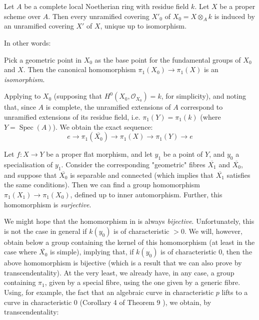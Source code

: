 \begin{theorem}\label{fga2-theorem-12}
    Let $A$ be a complete local Noetherian ring with residue field $k$.
    Let $X$ be a proper scheme over $A$.
    Then every unramified covering $X'_0$ of $X_0=X\otimes_Ak$ is induced by an unramified covering $X'$ of $X$, unique up to isomorphism.
\end{theorem}

In other words:

\begin{corollary}\label{fga2-theorem-12-corollary-1}
    Pick a geometric point in $X_0$ as the base point for the fundamental groups of $X_0$ and $X$.
    Then the canonical homomorphism $\pi_1(X_0)\to\pi_1(X)$ is an \emph{isomorphism}.
\end{corollary}


Applying  to $X_0$ (supposing that $H^0(X_0,\mathcal{O}_{X_0})=k$, for simplicity), and noting that, since $A$ is complete, the unramified extensions of $A$ correspond to unramified extensions of its residue field, i.e. $\pi_1(Y)=\pi_1(k)$ (where $Y=\operatorname{Spec}(A)$).
We obtain the exact sequence:
\[e \to \pi_1(\overline{X_0}) \to \pi_1(X) \to \pi_1(Y) \to e\]

\begin{corollary}\label{fga2-theorem-12-corollary-2}
    Let $f\colon X\to Y$ be a proper flat morphism, and let $y_1$ be a point of $Y$, and $y_0$ a specialisation of $y_1$.
    Consider the corresponding "geometric" fibres $\overline{X_1}$ and $\overline{X_0}$, and suppose that $\overline{X_0}$ is separable and connected (which implies that $\overline{X_1}$ satisfies the same conditions).
    Then we can find a group homomorphism $\pi_1(X_1)\to\pi_1(X_0)$, defined up to inner automorphism.
    Further, this homomorphism is \emph{surjective}.
\end{corollary}


We might hope that the homomorphism in  is always \emph{bijective}.
Unfortunately, this is not the case in general if $k(y_0)$ is of characteristic $>0$.
We will, however, obtain below a group containing the kernel of this homomorphism (at least in the case where $\overline{X_0}$ is simple), implying that, if $k(y_0)$ is of characteristic $0$, then the above homomorphism is bijective (which is a result that we can also prove by transcendentality).
At the very least, we already have, in any case, a group containing $\pi_1$, given by a special fibre, using the one given by a generic fibre.
Using, for example, the fact that an algebraic curve in characteristic $p$ lifts to a curve in characteristic $0$ (Corollary 4 of Theorem 9 ), we obtain, by transcendentality:


